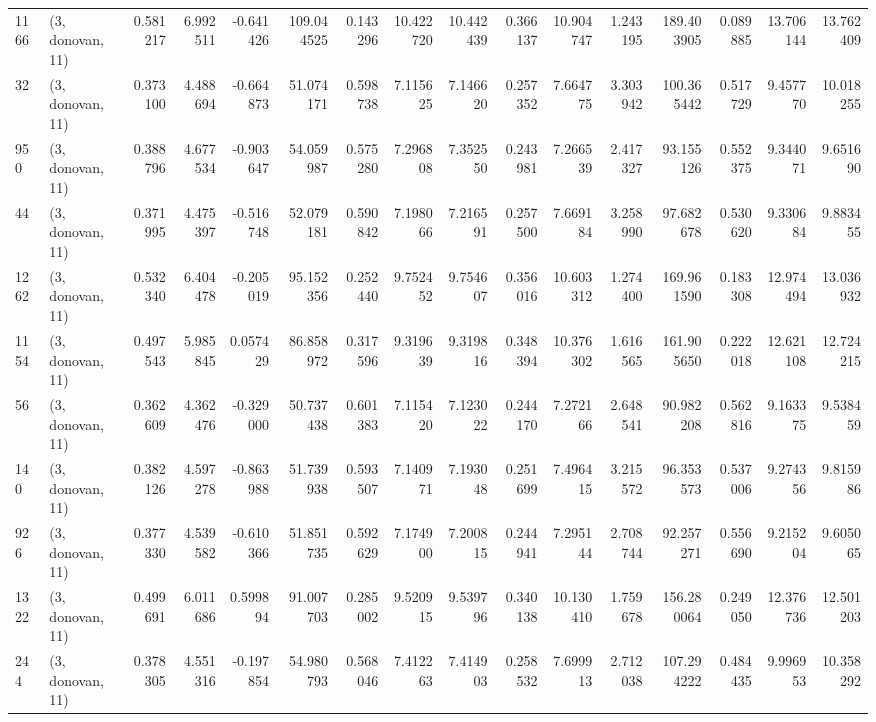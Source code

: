 \begin{tabular}{llrrrrrrrrrrrrrr}
1166 &  (3, donovan, 11) &   0.581217 &   6.992511 &  -0.641426 &    109.044525 &    0.143296 &   10.422720 &   10.442439 &  0.366137 &  10.904747 &   1.243195 &   189.403905 &   0.089885 &  13.706144 &  13.762409 \\
32   &  (3, donovan, 11) &   0.373100 &   4.488694 &  -0.664873 &     51.074171 &    0.598738 &    7.115625 &    7.146620 &  0.257352 &   7.664775 &   3.303942 &   100.365442 &   0.517729 &   9.457770 &  10.018255 \\
950  &  (3, donovan, 11) &   0.388796 &   4.677534 &  -0.903647 &     54.059987 &    0.575280 &    7.296808 &    7.352550 &  0.243981 &   7.266539 &   2.417327 &    93.155126 &   0.552375 &   9.344071 &   9.651690 \\
44   &  (3, donovan, 11) &   0.371995 &   4.475397 &  -0.516748 &     52.079181 &    0.590842 &    7.198066 &    7.216591 &  0.257500 &   7.669184 &   3.258990 &    97.682678 &   0.530620 &   9.330684 &   9.883455 \\
1262 &  (3, donovan, 11) &   0.532340 &   6.404478 &  -0.205019 &     95.152356 &    0.252440 &    9.752452 &    9.754607 &  0.356016 &  10.603312 &   1.274400 &   169.961590 &   0.183308 &  12.974494 &  13.036932 \\
1154 &  (3, donovan, 11) &   0.497543 &   5.985845 &   0.057429 &     86.858972 &    0.317596 &    9.319639 &    9.319816 &  0.348394 &  10.376302 &   1.616565 &   161.905650 &   0.222018 &  12.621108 &  12.724215 \\
56   &  (3, donovan, 11) &   0.362609 &   4.362476 &  -0.329000 &     50.737438 &    0.601383 &    7.115420 &    7.123022 &  0.244170 &   7.272166 &   2.648541 &    90.982208 &   0.562816 &   9.163375 &   9.538459 \\
140  &  (3, donovan, 11) &   0.382126 &   4.597278 &  -0.863988 &     51.739938 &    0.593507 &    7.140971 &    7.193048 &  0.251699 &   7.496415 &   3.215572 &    96.353573 &   0.537006 &   9.274356 &   9.815986 \\
926  &  (3, donovan, 11) &   0.377330 &   4.539582 &  -0.610366 &     51.851735 &    0.592629 &    7.174900 &    7.200815 &  0.244941 &   7.295144 &   2.708744 &    92.257271 &   0.556690 &   9.215204 &   9.605065 \\
1322 &  (3, donovan, 11) &   0.499691 &   6.011686 &   0.599894 &     91.007703 &    0.285002 &    9.520915 &    9.539796 &  0.340138 &  10.130410 &   1.759678 &   156.280064 &   0.249050 &  12.376736 &  12.501203 \\
244  &  (3, donovan, 11) &   0.378305 &   4.551316 &  -0.197854 &     54.980793 &    0.568046 &    7.412263 &    7.414903 &  0.258532 &   7.699913 &   2.712038 &   107.294222 &   0.484435 &   9.996953 &  10.358292 \\

\end{tabular}
